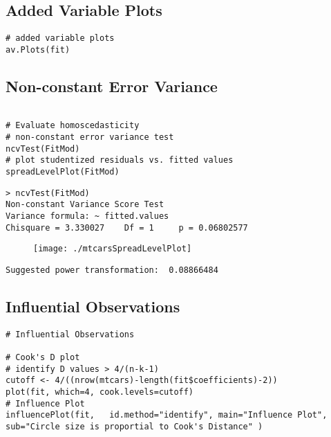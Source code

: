 \subsection{Added Variable Plots}
\begin{framed}
\begin{verbatim}
# added variable plots 
av.Plots(fit)
\end{verbatim}
\end{framed}

\subsection{Non-constant Error Variance}
\begin{framed}
\begin{verbatim}

# Evaluate homoscedasticity
# non-constant error variance test
ncvTest(FitMod)
# plot studentized residuals vs. fitted values 
spreadLevelPlot(FitMod)
\end{verbatim}
\end{framed}

\begin{verbatim}
> ncvTest(FitMod)
Non-constant Variance Score Test 
Variance formula: ~ fitted.values 
Chisquare = 3.330027    Df = 1     p = 0.06802577 
\end{verbatim}


\begin{figure}[h!]
\centering
\texttt{[image: ./mtcarsSpreadLevelPlot]}
\label{mtcarsSpreadLevelPlot}
\end{figure}


\begin{verbatim}
Suggested power transformation:  0.08866484 
\end{verbatim}

\subsection{Influential Observations}
\begin{framed}
\begin{verbatim}
# Influential Observations

# Cook's D plot
# identify D values > 4/(n-k-1) 
cutoff <- 4/((nrow(mtcars)-length(fit$coefficients)-2)) 
plot(fit, which=4, cook.levels=cutoff)
# Influence Plot 
influencePlot(fit,	 id.method="identify", main="Influence Plot", sub="Circle size is proportial to Cook's Distance" )
\end{verbatim}
\end{framed}

